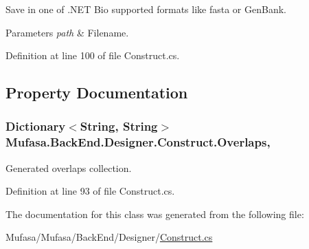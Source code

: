 Save in one of .N\+E\+T Bio supported formats like fasta or Gen\+Bank. 


\begin{DoxyParams}{Parameters}
{\em path} & Filename.\\
\hline
\end{DoxyParams}


Definition at line 100 of file Construct.\+cs.



\subsection{Property Documentation}
\hypertarget{class_mufasa_1_1_back_end_1_1_designer_1_1_construct_a5ffdd589eaa80f031fb7a7a7aff8bdb5}{
\subsubsection[{Overlaps}]{\setlength{\rightskip}{0pt plus 5cm}Dictionary$<$String, String$>$ Mufasa.\+Back\+End.\+Designer.\+Construct.\+Overlaps\hspace{0.3cm}{\ttfamily [get]}, {\ttfamily [set]}}}\label{class_mufasa_1_1_back_end_1_1_designer_1_1_construct_a5ffdd589eaa80f031fb7a7a7aff8bdb5}
Generated overlaps collection. 

Definition at line 93 of file Construct.\+cs.



The documentation for this class was generated from the following file\+:\begin{DoxyCompactItemize}
\item 
Mufasa/\+Mufasa/\+Back\+End/\+Designer/\hyperlink{_construct_8cs}{Construct.\+cs}\end{DoxyCompactItemize}
